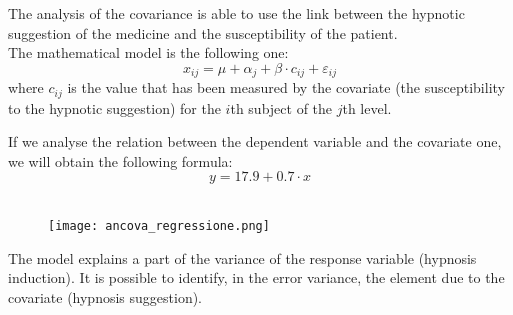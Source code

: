 \begin{frame}
  \vspace{.75cm}
   The analysis of the covariance is able to use the link between the hypnotic suggestion of the medicine and the susceptibility of the patient.\\
  \vspace{.50cm}
  The mathematical model is the following one:
  $$ x_{ij} = \mu + \alpha_j + \beta \cdot c_{ij} + \varepsilon_{ij} $$
  where $c_{ij}$ is the value that has been measured by the covariate (the susceptibility to the hypnotic suggestion) for the $ i $th subject of the $ j $th level.\\
\end{frame}

\begin{frame}
  \vspace{.25cm}
  If we analyse the relation between the dependent variable and the covariate one, we will obtain the following formula:
  \vspace{-0.3cm} $$ y = 17.9 + 0.7 \cdot x $$ \\
  \vspace{-0.5cm}
  \begin{figure}
    \texttt{[image: ancova\_regressione.png]}
  \end{figure}
  \vspace{-0.3cm}
  The model explains a part of the variance of the response variable (hypnosis induction). It is possible to identify, in the error variance, the element due to the covariate (hypnosis suggestion).
\end{frame}

